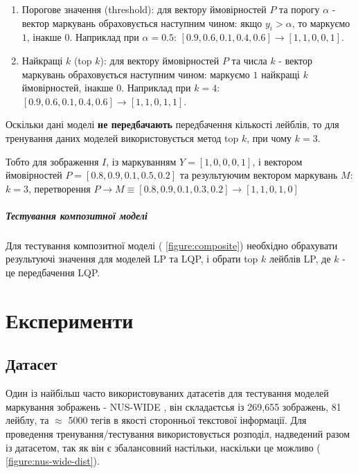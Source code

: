 \documentclass{udstu}
\begin{document}
\begin{enumerate}[1)]
	\item Порогове значення (threshold):
	для вектору ймовірностей $P$ та порогу $\alpha$ - вектор маркувань обраховується наступним чином:
	якщо $y_i > \alpha$, то маркуємо $1$, інакше $0$.
	Наприклад при $\alpha = 0.5$: $[0.9, 0.6, 0.1, 0.4, 0.6] \to [1,1,0,0,1]$.

	\item Найкращі $k$ (top $k$):
	для вектору ймовірностей $P$ та числа $k$ - вектор маркувань обраховується наступним чином:
	маркуємо $1$ найкращі $k$ ймовірностей, інакше $0$.
	Наприклад при $k = 4$: $[0.9, 0.6, 0.1, 0.4, 0.6] \to [1,1,0,1,1]$.
\end{enumerate}

Оскільки дані моделі \textbf{не передбачають} передбачення кількості лейблів,
то для тренування даних моделей використовується метод top $k$, при чому
$k = 3$.

\label{dynk}

Тобто для зображення $I$,
із маркуванням $Y = [1,0,0,0,1]$,
і вектором ймовірностей $P = [0.8,0.9,0.1,0.5,0.2]$
та результуючим вектором маркувань $M$:
$k = 3$, перетворення $P \to M \equiv [0.8,0.9,0.1,0.3,0.2] \to [1,1,0,1,0]$


\paragraph{\textbf{Тестування композитної моделі}\\}

Для тестування композитної моделі (\figurename{ \ref{figure:composite}})
необхідно обрахувати результуючі значення для моделей LP та LQP, і обрати
top $k$ лейблів LP, де $k$ - це передбачення LQP.


\chapter{Експерименти}

\section{Датасет}

Один із найбільш часто використовуваних датасетів для тестування моделей маркування зображень - NUS-WIDE \cite{nus-wide-civr09},
він складаєтсья із 269,655 зображень, 81 лейблу, та $\approx$ 5000 тегів в якості сторонньої текстової інформації.
Для проведення тренування/тестування використовується розподіл, надведений разом із
датасетом, так як він є збалансовний настільки, наскільки це можливо (\figurename{ \ref{figure:nus-wide-dist}}).
\end{document}
